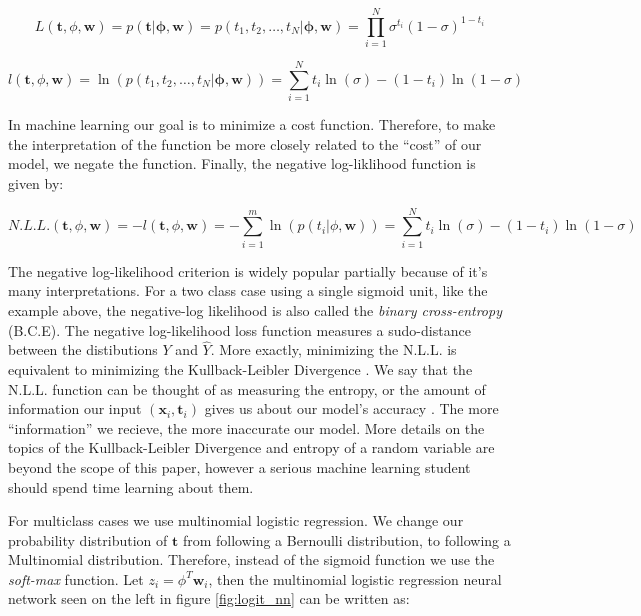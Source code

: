 \message{ !name(main.tex)}\documentclass[11pt]{article}
\begin{document}
\begin{equation}\label{eq:prod_bern}
  L\left(\mathbf{t},\phi,\mathbf{w}\right) = p\left(\mathbf{t}|\mathbf{\phi},\mathbf{w}\right) = p\left(t_{1},t_{2},\ldots,t_{N}|\mathbf{\phi},\mathbf{w}\right) = \prod_{i=1}^{N}\sigma^{t_{i}}\left(1-\sigma\right)^{1-t_{i}}
\end{equation}

\begin{equation}
  l\left(\mathbf{t},\phi,\mathbf{w}\right) = \ln\left(p\left(t_{1},t_{2},\ldots,t_{N}|\mathbf{\phi},\mathbf{w}\right)\right) = \sum_{i=1}^{N}t_{i}\ln\left(\sigma\right) - \left(1-t_{i}\right)\ln\left(1-\sigma\right)
\end{equation}

In machine learning our goal is to minimize a cost function. Therefore, to make the interpretation of the function be more closely related to the ``cost'' of our model, we negate the function. Finally, the negative log-liklihood function is given by:

\begin{equation}
  N.L.L.\left(\mathbf{t},\phi,\mathbf{w}\right) = -l\left(\mathbf{t},\phi,\mathbf{w}\right) = -\sum_{i=1}^{m}\ln\left(p\left(t_{i}|\phi,\mathbf{w}\right)\right) = \sum_{i=1}^{N}t_{i}\ln\left(\sigma\right) - \left(1-t_{i}\right)\ln\left(1-\sigma\right)
\end{equation}

The negative log-likelihood criterion is widely popular partially because of it's many interpretations. For a two class case using a single sigmoid unit, like the example above, the negative-log likelihood is also called the \emph{binary cross-entropy} (B.C.E). The negative log-likelihood loss function measures a sudo-distance between the distibutions $Y$ and $\hat{Y}$. More exactly, minimizing the N.L.L. is equivalent to minimizing the Kullback-Leibler Divergence \cite{Freitas}. We say that the N.L.L. function can be thought of as measuring the entropy, or the amount of information our input $\left(\mathbf{x}_{i},\mathbf{t}_{i}\right)$ gives us about our model's accuracy \cite{Freitas}. The more ``information'' we recieve, the more inaccurate our model. More details on the topics of the Kullback-Leibler Divergence and entropy of a random variable are beyond the scope of this paper, however a serious machine learning student should spend time learning about them.


For multiclass cases we use multinomial logistic regression. We change our probability distribution of $\mathbf{t}$ from following a Bernoulli distribution, to following a Multinomial distribution. Therefore, instead of the sigmoid function we use the \emph{soft-max} function. Let $z_{i} = \phi^{T}\mathbf{w}_{i}$, then the multinomial logistic regression neural network seen on the left in figure \ref{fig:logit_nn} can be written as:
\end{document}
